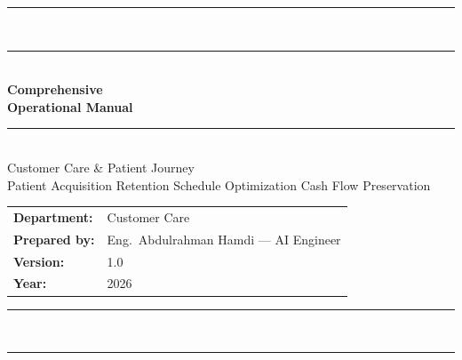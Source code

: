 \documentclass[11pt,a4paper]{article}
\begin{document}

\begin{titlepage}
\pagecolor{PrimaryBlue}\color{white}
\vspace*{1.0cm}
\begin{center}
  \textcolor{AccentGold}{\rule{0.88\linewidth}{2pt}}\\[0.3em]
  \textcolor{AccentGold}{\rule{0.88\linewidth}{0.5pt}}\\[2.0cm]

  {\fontsize{38}{46}\selectfont\bfseries Comprehensive}\\[0.2em]
  {\fontsize{28}{36}\selectfont\bfseries Operational Manual}\\[1.0em]

  \textcolor{AccentGold}{\rule{0.5\linewidth}{0.8pt}}\\[0.8em]
  {\Large Customer Care \& Patient Journey}\\[0.4em]
  {\color{SoftBlue}\small
    Patient Acquisition \textbullet{} Retention \textbullet{}
    Schedule Optimization \textbullet{} Cash Flow Preservation}\\[2.8cm]

  \begin{tabular}{@{}ll@{}}
    \textcolor{AccentGold}{\bfseries Department:} & Customer Care \\[0.3em]
    \textcolor{AccentGold}{\bfseries Prepared by:} & Eng.\ Abdulrahman Hamdi --- AI Engineer \\[0.3em]
    \textcolor{AccentGold}{\bfseries Version:} & 1.0 \\[0.3em]
    \textcolor{AccentGold}{\bfseries Year:} & 2026 \\
  \end{tabular}

  \vfill
  \textcolor{AccentGold}{\rule{0.88\linewidth}{0.5pt}}\\[0.3em]
  \textcolor{AccentGold}{\rule{0.88\linewidth}{2pt}}
\end{center}
\end{titlepage}
\nopagecolor\color{black}

\newpage
\tableofcontents
\newpage

\end{document}
